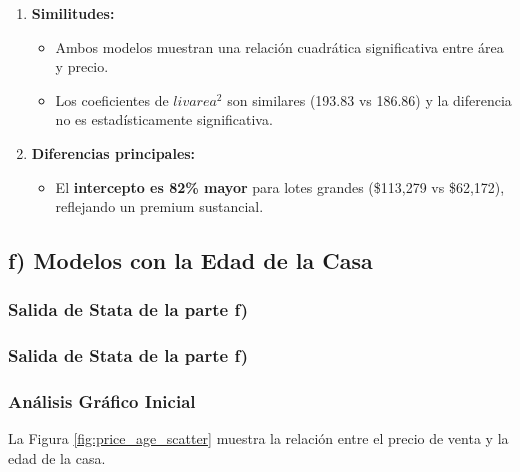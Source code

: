 \documentclass[12pt]{article}
\begin{document}
\begin{enumerate}
    \item \textbf{Similitudes:}
    \begin{itemize}
        \item Ambos modelos muestran una relación cuadrática significativa entre área y precio.
        \item Los coeficientes de $livarea^2$ son similares (193.83 vs 186.86) y la diferencia no es estadísticamente significativa.
       
    \end{itemize}
    
    \item \textbf{Diferencias principales:}
    \begin{itemize}
        \item El \textbf{intercepto es 82\% mayor} para lotes grandes (\$113,279 vs \$62,172), reflejando un premium sustancial.
       
       
    \end{itemize}
    
\end{enumerate}

\subsection*{f) Modelos con la Edad de la Casa}

\subsubsection*{Salida de Stata de la parte f)}

\subsubsection*{Salida de Stata de la parte f)}



\subsubsection*{Análisis Gráfico Inicial}

La Figura \ref{fig:price_age_scatter} muestra la relación entre el precio de venta y la edad de la casa.
\end{document}
